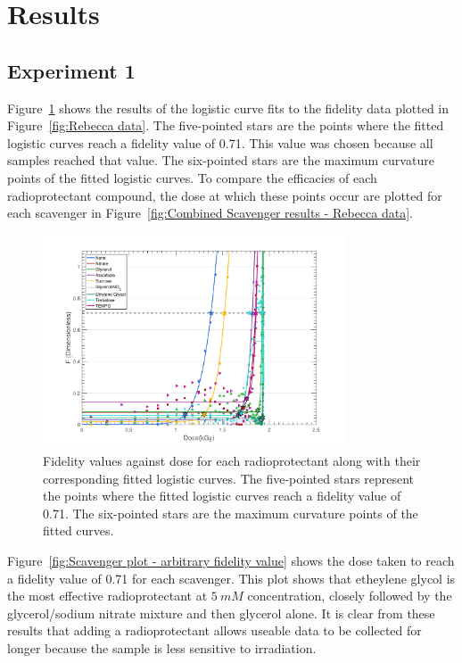 \section{Results}
\label{sec:Results}

\subsection{Experiment 1}
\label{sub:Experiment 1 - Results}
Figure~\ref{fig:Main radioprotectant plot - Rebecca data} shows the results of the logistic curve fits to the fidelity data plotted in Figure~\ref{fig:Rebecca data}. The five-pointed stars are the points where the fitted logistic curves reach a fidelity value of 0.71. This value was chosen because all samples reached that value. The six-pointed stars are the maximum curvature points of the fitted logistic curves. To compare the efficacies of each radioprotectant compound, the dose at which these points occur are plotted for each scavenger in Figure~\ref{fig:Combined Scavenger results - Rebecca data}.

\begin{figure}
    \centering
    \includegraphics[width=0.8\textwidth]{figures/saxs/ScavengerPlot.pdf}
    \caption{Fidelity values against dose for each radioprotectant along with their corresponding fitted logistic curves. The five-pointed stars represent the points where the fitted logistic curves reach a fidelity value of 0.71. The six-pointed stars are the maximum curvature points of the fitted curves.}
    \label{fig:Main radioprotectant plot - Rebecca data}
\end{figure}

Figure~\ref{fig:Scavenger plot - arbitrary fidelity value} shows the dose taken to reach a fidelity value of 0.71 for each scavenger. This plot shows that etheylene glycol is the most effective radioprotectant at $5\ mM$ concentration, closely followed by the glycerol/sodium nitrate mixture and then glycerol alone. It is clear from these results that adding a radioprotectant allows useable data to be collected for longer because the sample is less sensitive to irradiation.

